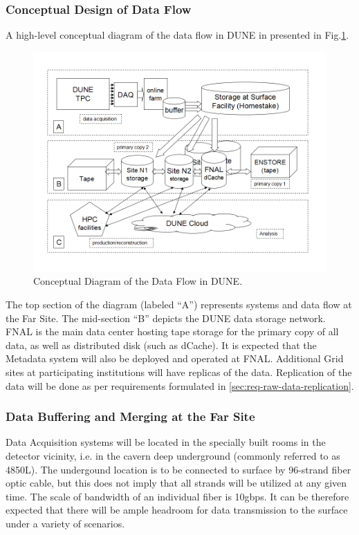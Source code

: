 \subsubsection{Conceptual Design of Data Flow}
A high-level conceptual diagram of the data flow in DUNE in presented in Fig.\ref{fig:DUNEdataflow}.
\begin{figure}[h!]
\centering
\includegraphics[width=\textwidth]{DUNEdataflow.png}
\caption{Conceptual Diagram of the Data Flow in DUNE.}
\label{fig:DUNEdataflow}
\end{figure}

\noindent
The top section of the diagram (labeled ``A'') represents systems and data flow at the Far Site.
The mid-section ``B'' depicts the DUNE data storage network. FNAL is the main data center
hosting tape storage for the primary copy of all data, as well as distributed disk (such as dCache).
It is expected that the Metadata system will also be deployed and operated at FNAL.
Additional Grid sites at participating institutions will have replicas of the data.
Replication of the data will be done as per requirements formulated in \ref{sec:req-raw-data-replication}.

\subsubsection{Data Buffering and Merging at the Far Site}
Data Acquisition systems will be located in the specially built rooms in the detector vicinity,
i.e. in the cavern deep underground (commonly referred to as 4850L). The undergound location is to be
connected to surface by 96-strand fiber optic cable, but this does not imply that all strands will be
utilized at any given time. The scale of bandwidth of an individual fiber is 10gbps. It can be therefore
expected that there will be ample headroom for data transmission to the surface under a variety of scenarios.

